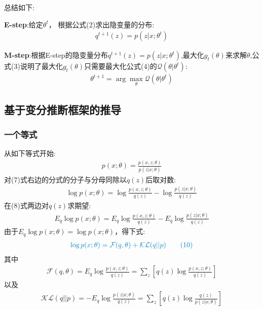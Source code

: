 \documentclass[UTF8]{ctexart}
\begin{document}
总结如下:

\textbf{E-step}:给定$\theta^{t}$， 根据公式(2)求出隐变量的分布:
\begin{align}
    q^{t+1}(z)= p(z|x;\theta^t) \tag{5}
\end{align}

\textbf{M-step}:根据E-step的隐变量分布$q^{t+1}(z)= p(z|x;\theta^t)$,最大化$g_t(\theta)$来求解$\theta$,公式(3)说明了最大化$g_t(\theta)$只需要最大化公式(4)的$\mathcal{Q}(\theta|\theta^t)$:
\begin{align}
    \theta^{t+1} = \arg\max\limits_{\theta}\mathcal{Q}(\theta|\theta^t) \tag{6}
\end{align}


\subsection{基于变分推断框架的推导}
\subsubsection{一个等式}

从如下等式开始:
\begin{align}
  p(x;\theta) = \frac{p(x, z;\theta)}{p(z|x;\theta)} \tag{7}
\end{align}
对(7)式右边的分式的分子与分母同除以$q(z)$后取对数:
\begin{align}
  \log p(x;\theta) = \log\frac{p(x, z;\theta)}{q(z)} - \log\frac{p(z|x;\theta)}{q(z)} \tag{8}
\end{align}
在(8)式两边对$q(z)$求期望:
\begin{align}
  E_{q}\log p(x;\theta) = E_{q}\log\frac{p(x, z;\theta)}{q(z)} - E_{q}\log\frac{p(z|x;\theta)}{q(z)} \tag{9}
\end{align}
由于$E_{q}\log p(x;\theta) = \log p(x;\theta)$，得下式:
\begin{align}
  \textcolor[rgb]{0.00,0.50,0.75}{\log p(x;\theta) = \mathcal{F}(q,\theta)+\mathcal{KL}(q||p) \tag{10}}
\end{align}
其中
\begin{align}
    \mathcal{F}(q,\theta)= E_{q}\log\frac{p(x, z;\theta)}{q(z)} = \sum_{z}\left[q(z)\log\frac{p(x, z;\theta)}{q(z)}\right] \tag{11}
\end{align}
以及
\begin{align}
    \mathcal{KL}(q||p) = - E_{q}\log\frac{p(z|x;\theta)}{q(z)} = \sum_{z}\left[q(z)\log\frac{q(z)}{p(z|x;\theta)}\right] \tag{12}
\end{align}
\end{document}
